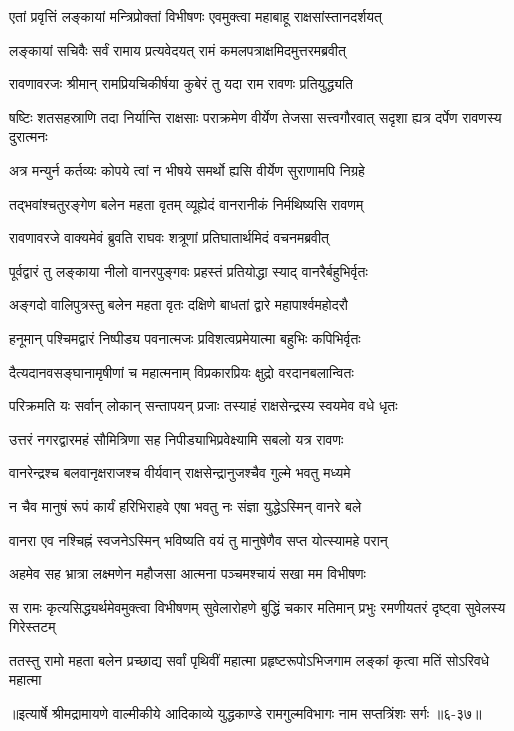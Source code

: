 \twolineshloka
{एतां प्रवृत्तिं लङ्कायां मन्त्रिप्रोक्तां विभीषणः}
{एवमुक्त्वा महाबाहू राक्षसांस्तानदर्शयत्} %

\twolineshloka
{लङ्कायां सचिवैः सर्वं रामाय प्रत्यवेदयत्}
{रामं कमलपत्राक्षमिदमुत्तरमब्रवीत्} %

\twolineshloka
{रावणावरजः श्रीमान् रामप्रियचिकीर्षया}
{कुबेरं तु यदा राम रावणः प्रतियुद्ध्यति} %

\threelineshloka
{षष्टिः शतसहस्राणि तदा निर्यान्ति राक्षसाः}
{पराक्रमेण वीर्येण तेजसा सत्त्वगौरवात्}
{सदृशा ह्यत्र दर्पेण रावणस्य दुरात्मनः} %

\twolineshloka
{अत्र मन्युर्न कर्तव्यः कोपये त्वां न भीषये}
{समर्थो ह्यसि वीर्येण सुराणामपि निग्रहे} %

\twolineshloka
{तद्भवांश्चतुरङ्गेण बलेन महता वृतम्}
{व्यूह्येदं वानरानीकं निर्मथिष्यसि रावणम्} %

\twolineshloka
{रावणावरजे वाक्यमेवं ब्रुवति राघवः}
{शत्रूणां प्रतिघातार्थमिदं वचनमब्रवीत्} %

\twolineshloka
{पूर्वद्वारं तु लङ्काया नीलो वानरपुङ्गवः}
{प्रहस्तं प्रतियोद्धा स्याद् वानरैर्बहुभिर्वृतः} %

\twolineshloka
{अङ्गदो वालिपुत्रस्तु बलेन महता वृतः}
{दक्षिणे बाधतां द्वारे महापार्श्वमहोदरौ} %

\twolineshloka
{हनूमान् पश्चिमद्वारं निष्पीड्य पवनात्मजः}
{प्रविशत्वप्रमेयात्मा बहुभिः कपिभिर्वृतः} %

\twolineshloka
{दैत्यदानवसङ्घानामृषीणां च महात्मनाम्}
{विप्रकारप्रियः क्षुद्रो वरदानबलान्वितः} %

\twolineshloka
{परिक्रमति यः सर्वान् लोकान् सन्तापयन् प्रजाः}
{तस्याहं राक्षसेन्द्रस्य स्वयमेव वधे धृतः} %

\twolineshloka
{उत्तरं नगरद्वारमहं सौमित्रिणा सह}
{निपीड्याभिप्रवेक्ष्यामि सबलो यत्र रावणः} %

\twolineshloka
{वानरेन्द्रश्च बलवानृक्षराजश्च वीर्यवान्}
{राक्षसेन्द्रानुजश्चैव गुल्मे भवतु मध्यमे} %

\twolineshloka
{न चैव मानुषं रूपं कार्यं हरिभिराहवे}
{एषा भवतु नः संज्ञा युद्धेऽस्मिन् वानरे बले} %

\twolineshloka
{वानरा एव नश्चिह्नं स्वजनेऽस्मिन् भविष्यति}
{वयं तु मानुषेणैव सप्त योत्स्यामहे परान्} %

\twolineshloka
{अहमेव सह भ्रात्रा लक्ष्मणेन महौजसा}
{आत्मना पञ्चमश्चायं सखा मम विभीषणः} %

\threelineshloka
{स रामः कृत्यसिद्ध्यर्थमेवमुक्त्वा विभीषणम्}
{सुवेलारोहणे बुद्धिं चकार मतिमान् प्रभुः}
{रमणीयतरं दृष्ट्वा सुवेलस्य गिरेस्तटम्} %

\twolineshloka
{ततस्तु रामो महता बलेन प्रच्छाद्य सर्वां पृथिवीं महात्मा}
{प्रहृष्टरूपोऽभिजगाम लङ्कां कृत्वा मतिं सोऽरिवधे महात्मा} %


॥इत्यार्षे श्रीमद्रामायणे वाल्मीकीये आदिकाव्ये युद्धकाण्डे रामगुल्मविभागः नाम सप्तत्रिंशः सर्गः ॥६-३७॥
